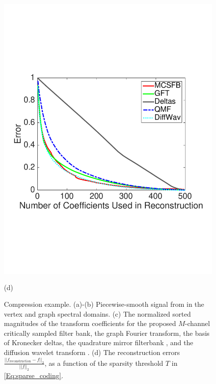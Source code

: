 \documentclass[journal, 10pt]{IEEEtran}
\begin{document}
\begin{figure}[tbh]
\begin{minipage}[m]{0.48\linewidth}
\centerline{\includegraphics[width=.98\linewidth]{fig_comp_error}}
\centerline{\small{(d)}}
\end{minipage}
\caption{Compression example. (a)-(b) Piecewise-smooth signal from \cite[Fig. 11]{shuman_TSP_multiscale} in the vertex and graph spectral domains. (c) The normalized sorted magnitudes of the transform coefficients for the proposed $M$-channel critically sampled filter bank, the graph Fourier transform, the basis of Kronecker deltas, the quadrature mirror filterbank \cite{narang2012perfect}, and the diffusion wavelet transform \cite{coifman2006diffusion}. (d) The reconstruction errors  $\frac{\left|\left|f_{\mbox{reconstruction}}-f\right|\right|_2}{||f||_2}$, as a function of the sparsity threshold $T$ in \eqref{Eq:sparse_coding}.} \label{Fig:comp}
\end{figure}
\end{document}

